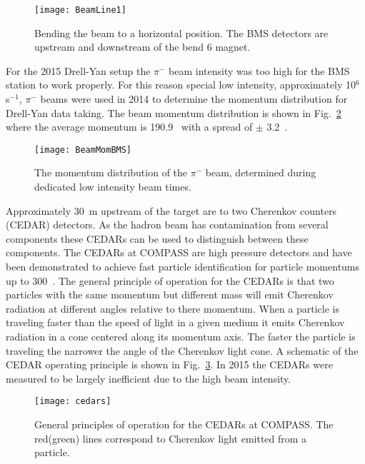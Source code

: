 \begin{figure}[h!t]
  \centering
  \texttt{[image: BeamLine1]}
  \caption{Bending the beam to a horizontal position.  The BMS detectors are
    upstream and downstream of the bend 6 magnet.}
  \label{fig::BeamLine1}
\end{figure}

For the 2015 Drell-Yan setup the $\pi^-$ beam intensity was too high for the BMS
station to work properly.  For this reason special low intensity, approximately
10$^6$ s$^{-1}$, $\pi^-$ beams were used in 2014 to determine the momentum
distribution for Drell-Yan data taking.  The beam momentum distribution is shown
in Fig.~\ref{fig::BeamMomBMS} where the average momentum is 190.9~{\gvc} with a
spread of $\pm$ 3.2~{\gvc}. \par

\begin{figure}[h!t]
  \centering
  \texttt{[image: BeamMomBMS]}
  \caption{The momentum distribution of the $\pi^-$ beam, determined during
    dedicated low intensity beam times.}
  \label{fig::BeamMomBMS}
\end{figure}

Approximately 30~m upstream of the target are to two Cherenkov counters (CEDAR)
detectors.  As the hadron beam has contamination from several components these
CEDARs can be used to distinguish between these components.  The CEDARs at
COMPASS are high pressure detectors and have been demonstrated to achieve fast
particle identification for particle momentums up to 300~{\gvc}.  The general
principle of operation for the CEDARs is that two particles with the same
momentum but different mass will emit Cherenkov radiation at different angles
relative to there momentum.  When a particle is traveling faster than the speed
of light in a given medium it emits Cherenkov radiation in a cone centered along
its momentum axis.  The faster the particle is traveling the narrower the angle
of the Cherenkov light cone.  A schematic of the CEDAR operating principle is
shown in Fig.~\ref{fig::cedars}.  In 2015 the CEDARs were measured to be largely
inefficient due to the high beam intensity.

\begin{figure}[h!t]
  \centering
  \texttt{[image: cedars]}
  \caption{General principles of operation for the CEDARs at COMPASS.  The
    red(green) lines correspond to Cherenkov light emitted from a particle.}
  \label{fig::cedars}
\end{figure}



